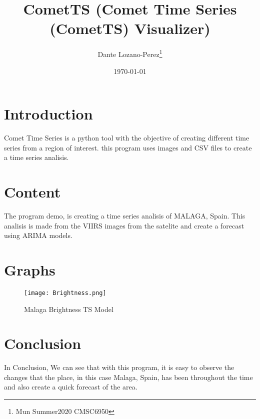 \documentclass{article}
\begin{document}
\title{CometTS (Comet Time Series (CometTS) Visualizer)} 
\author{Dante Lozano-Perez\thanks{Mun Summer2020 CMSC6950}}
\date{\today}

\maketitle

\section{Introduction}
Comet Time Series is a python tool with the objective of creating different time series from a region of interest. this program uses images and CSV files to create a time series analisis.


\section{Content}

The program demo, is creating a time series analisis of MALAGA, Spain. This analisis is made from the VIIRS images from the satelite and create a forecast using ARIMA models.


\section{Graphs}

    \begin{figure}[h!]
        \centering
        \texttt{[image: Brightness.png]}
        \caption{Malaga Brightness TS Model}
        \label{fig:ARIMA1}
        \end{figure}



\section{Conclusion}
In Conclusion, We can see that with this program, it is easy to observe the changes that the place, in this case Malaga, Spain, has been throughout the time and also create a quick forecast of the area.
\end{document}
